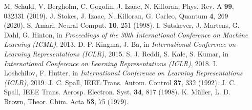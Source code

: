  M. Schuld, V. Bergholm, C. Gogolin, J. Izaac, N. Killoran, Phys. Rev. A \textbf{99}, 032331 (2019).
 J. Stokes, J. Izaac, N. Killoran, G. Carleo, Quantum \textbf{4}, 269 (2020).
 S. Amari, Neural Comput. \textbf{10}, 251 (1998).
 I. Sutskever, J. Martens, G. Dahl, G. Hinton, in \emph{Proceedings of the 30th International Conference on Machine Learning (ICML)}, 2013.
 D. P. Kingma, J. Ba, in \emph{International Conference on Learning Representations (ICLR)}, 2015.
 S. J. Reddi, S. Kale, S. Kumar, in \emph{International Conference on Learning Representations (ICLR)}, 2018.
 I. Loshchilov, F. Hutter, in \emph{International Conference on Learning Representations (ICLR)}, 2019.
 J. C. Spall, IEEE Trans. Autom. Control \textbf{37}, 332 (1992).
 J. C. Spall, IEEE Trans. Aerosp. Electron. Syst. \textbf{34}, 817 (1998).
 K. M\"uller, L. D. Brown, Theor. Chim. Acta \textbf{53}, 75 (1979).
